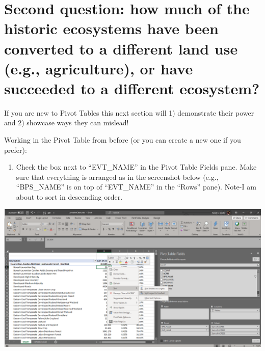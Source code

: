 \documentclass[
]{book}
\providecommand{\tightlist}{%
  \setlength{\itemsep}{0pt}\setlength{\parskip}{0pt}}
\begin{document}
\hypertarget{second-question-how-much-of-the-historic-ecosystems-have-been-converted-to-a-different-land-use-e.g.-agriculture-or-have-succeeded-to-a-different-ecosystem}{%
\section{Second question: how much of the historic ecosystems have been converted to a different land use (e.g., agriculture), or have succeeded to a different ecosystem?}\label{second-question-how-much-of-the-historic-ecosystems-have-been-converted-to-a-different-land-use-e.g.-agriculture-or-have-succeeded-to-a-different-ecosystem}}

If you are new to Pivot Tables this next section will 1) demonstrate their power and 2) showcase ways they can mislead!

Working in the Pivot Table from before (or you can create a new one if you prefer):

\begin{enumerate}
\def\labelenumi{\arabic{enumi}.}
\tightlist
\item
  Check the box next to ``EVT\_NAME'' in the Pivot Table Fields pane. Make sure that everything is arranged as in the screenshot below (e.g., ``BPS\_NAME'' is on top of ``EVT\_NAME'' in the ``Rows'' pane). Note-I am about to sort in descending order.
\end{enumerate}

\includegraphics[width=1\linewidth]{pivotBpsEvt}
\end{document}
